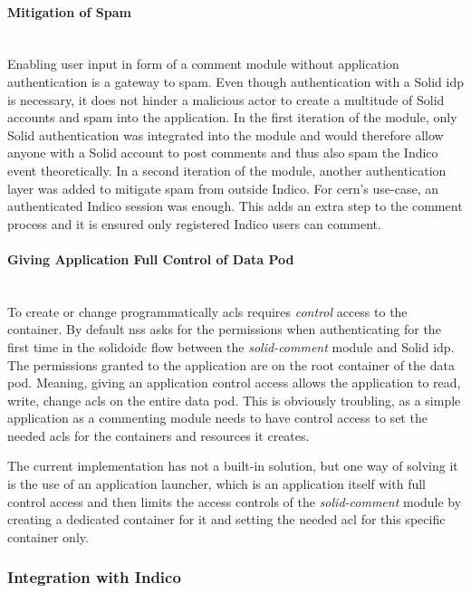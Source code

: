 \paragraph{Mitigation of Spam}\mbox{}\\

Enabling user input in form of a comment module without application authentication is a gateway to spam. Even though authentication with a Solid \gls{idp} is necessary, it does not hinder a malicious actor to create a multitude of Solid accounts and spam into the application. In the first iteration of the module, only Solid authentication was integrated into the module and would therefore allow anyone with a Solid account to post comments and thus also spam the Indico event theoretically. In a second iteration of the module, another authentication layer was added to mitigate spam from outside Indico. For \gls{cern}’s use-case, an authenticated Indico session was enough. This adds an extra step to the comment process and it is ensured only registered Indico users can comment.
\vspace{0.5cm}
\paragraph{Giving Application Full Control of Data Pod}\mbox{}\\

To create or change programmatically \glspl{acl} requires \textit{control} access to the container. By default \gls{nss} asks for the permissions when authenticating for the first time in the \gls{solidoidc} flow between the \textit{solid-comment} module and Solid \gls{idp}. The permissions granted to the application are on the root container of the data pod. Meaning, giving an application control access allows the application to read, write, change \glspl{acl} on the entire data pod. This is obviously troubling, as a simple application as a commenting module needs to have control access to set the needed \glspl{acl} for the containers and resources it creates.

The current implementation has not a built-in solution, but one way of solving it is the use of an application launcher, which is an application itself with full control access and then limits the access controls of the \textit{solid-comment} module by creating a dedicated container for it and setting the needed \gls{acl} for this specific container only.

\subsubsection{Integration with Indico}\mbox{}\\

